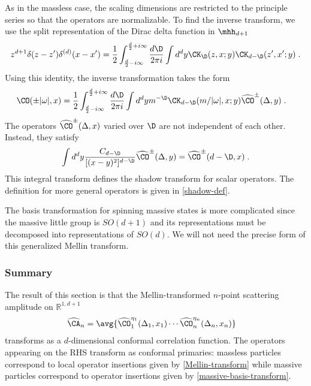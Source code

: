 \documentclass[11pt]{article}
\def\d{{\delta}}
\def\o{{\omega}}
\begin{document}
As in the massless case, the scaling dimensions are restricted to the principle series so that the operators are normalizable. To find the inverse transform, we use the split representation of the Dirac delta function in $\mhh_{d+1}$
\begin{equation}
\begin{split}
z^{d+1} \d ( z - z' ) \d^{(d)} ( x - x' )  = \frac{1}{2}\int_{\frac{d}{2}-i\infty}^{\frac{d}{2}+i\infty} \frac{d\D}{2\pi i}  \int d^d y \CK_\D  ( z , x ; y ) \CK_{d-\D} ( z' , x'  ; y )  \; . 
\end{split}
\end{equation}
Using this identity, the inverse transformation takes the form
\begin{equation}
\begin{split}\label{massive-inverse-basis-transform}
\CO(\pm|\o|,x)  &= \frac{1}{2} \int_{\frac{d}{2}-i\infty}^{\frac{d}{2}+i\infty} \frac{d\D}{2\pi i} \int d^d y m^{-\D}  \CK_{d-\D} (   m / |\o| ,x  ; y ) \widehat{\CO}^\pm(\Delta,y)  \; . 
\end{split}
\end{equation}
The operators $\widehat{\CO}^\pm(\Delta,x)$ varied over $\D$ are not independent of each other. Instead, they satisfy
\begin{equation}
\begin{split}
 \int d^d y \frac{C_{d-\D}}{ [ ( x - y )^2 ]^{d-\D}  } {\widehat \CO}^\pm(\Delta,y) = \widehat{\CO}^\pm(d-\D,x) \;  .
\end{split}
\end{equation}
This integral transform defines the shadow transform for scalar operators. The definition for more general operators is given in \eqref{shadow-def}.


The basis transformation for spinning massive states is more complicated since the massive little group is $SO(d+1)$ and its representations must be decomposed  into representations of $SO(d)$. We will not need the precise form of this generalized Mellin transform.

\subsubsection*{Summary}

The result of this section is that the Mellin-transformed $n$-point scattering amplitude on $\mathbb{R}^{1,d+1}$ 
\begin{equation}
\begin{split}\label{Andef}
\widehat{\CA}_n &=  \avg{ \widehat{\CO}^{\eta_1}_{1}(\Delta_1,x_1) \cdots \widehat{\CO}^{\eta_n}_{n}(\Delta_n, x_n) }  
\end{split}
\end{equation}
transforms as a $d$-dimensional conformal correlation function. The operators appearing on the RHS transform as conformal primaries: massless particles correspond to local operator insertions given by \eqref{Mellin-transform} while massive particles correspond to operator insertions given by \eqref{massive-basis-transform}.
\end{document}
